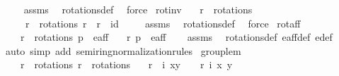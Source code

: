 \begin{isabellebody}
%
\isadelimproof
\ \ %
\endisadelimproof
%
\isatagproof
{}\isamarkupfalse%
\ assms\ \isamarkupfalse%
\ rotations{\isacharunderscore}def\ \isamarkupfalse%
\ force%
\endisatagproof
{\isafoldproof}%
%
\isadelimproof
\isanewline
%
\endisadelimproof
\isanewline
{}\isamarkupfalse%
\ rot{\isacharunderscore}inv{\isacharcolon}\isanewline
\ \ \ {\isachardoublequoteopen}r\ {\isasymin}\ rotations{\isachardoublequoteclose}\isanewline
\ \ \ {\isachardoublequoteopen}{\isasymexists}\ r{\isacharprime}\ {\isasymin}\ rotations{\isachardot}\ r{\isacharprime}\ {\isasymcirc}\ r\ {\isacharequal}\ id{\isachardoublequoteclose}\ \isanewline
%
\isadelimproof
\ \ %
\endisadelimproof
%
\isatagproof
{}\isamarkupfalse%
\ assms\ \isamarkupfalse%
\ rotations{\isacharunderscore}def\ \isamarkupfalse%
\ force%
\endisatagproof
{\isafoldproof}%
%
\isadelimproof
\isanewline
%
\endisadelimproof
\isanewline
{}\isamarkupfalse%
\ rot{\isacharunderscore}aff{\isacharcolon}\isanewline
\ \ \ {\isachardoublequoteopen}r\ {\isasymin}\ rotations{\isachardoublequoteclose}\ {\isachardoublequoteopen}p\ {\isasymin}\ e{\isacharunderscore}aff{\isachardoublequoteclose}\isanewline
\ \ \ {\isachardoublequoteopen}r\ p\ {\isasymin}\ e{\isacharunderscore}aff{\isachardoublequoteclose}\isanewline
%
\isadelimproof
\ \ %
\endisadelimproof
%
\isatagproof
{}\isamarkupfalse%
\ assms\ \isamarkupfalse%
\ rotations{\isacharunderscore}def\ e{\isacharunderscore}aff{\isacharunderscore}def\ e{\isacharprime}{\isacharunderscore}def\isanewline
\ \ \isamarkupfalse%
{\isacharparenleft}auto\ simp\ add{\isacharcolon}\ semiring{\isacharunderscore}normalization{\isacharunderscore}rules{\isacharparenleft}{}{}{\isacharparenright}{\isacharparenright}%
\endisatagproof
{\isafoldproof}%
%
\isadelimproof
\isanewline
%
\endisadelimproof
\isanewline
{}\isamarkupfalse%
\ group{\isacharunderscore}lem{\isacharcolon}\isanewline
\ \ \ {\isachardoublequoteopen}r{\isacharprime}\ {\isasymin}\ rotations{\isachardoublequoteclose}\ {\isachardoublequoteopen}r\ {\isasymin}\ rotations{\isachardoublequoteclose}\isanewline
\ \ \ {\isachardoublequoteopen}{\isacharparenleft}r{\isacharprime}\ {\isasymcirc}\ i{\isacharparenright}\ {\isacharparenleft}x{\isacharcomma}y{\isacharparenright}\ {\isacharequal}\ {\isacharparenleft}{\isasymtau}\ {\isasymcirc}\ r{\isacharparenright}\ {\isacharparenleft}i\ {\isacharparenleft}x{\isacharcomma}\ y{\isacharparenright}{\isacharparenright}{\isachardoublequoteclose}\isanewline

\end{isabellebody}

